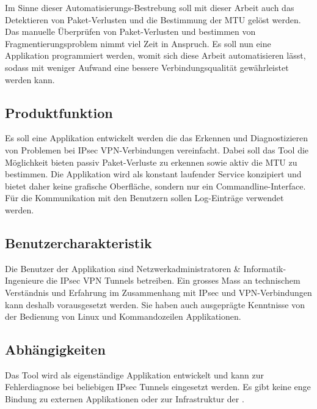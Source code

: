Im Sinne dieser Automatisierungs-Bestrebung soll mit dieser Arbeit auch das Detektieren von Paket-Verlusten und die Bestimmung der MTU gelöst werden.
Das manuelle Überprüfen von Paket-Verlusten und bestimmen von Fragmentierungsproblem nimmt viel Zeit in Anspruch. Es soll nun eine Applikation programmiert werden, womit sich diese Arbeit automatisieren lässt, sodass mit weniger Aufwand eine bessere Verbindungsqualität gewährleistet werden kann.


\subsection{Produktfunktion}
Es soll eine Applikation entwickelt werden die das Erkennen und Diagnostizieren von Problemen bei \acs{IPsec} \acs{VPN}-Verbindungen vereinfacht. Dabei soll das Tool die Möglichkeit bieten passiv Paket-Verluste zu erkennen sowie aktiv die \acs{MTU} zu bestimmen. Die Applikation wird als konstant laufender Service konzipiert und bietet daher keine grafische Oberfläche, sondern nur ein Commandline-Interface. Für die Kommunikation mit den Benutzern sollen Log-Einträge verwendet werden.

\subsection{Benutzercharakteristik}
Die Benutzer der Applikation sind Netzwerkadministratoren \& Informatik-Ingenieure die \acs{IPsec} \acs{VPN} Tunnels betreiben. Ein grosses Mass an technischem Verständnis und Erfahrung im Zusammenhang mit \acs{IPsec} und \acs{VPN}-Verbindungen kann deshalb vorausgesetzt werden. Sie haben auch ausgeprägte Kenntnisse von der Bedienung von Linux und Kommandozeilen Applikationen.

\subsection{Abhängigkeiten}
Das Tool wird als eigenständige Applikation entwickelt und kann zur Fehlerdiagnose bei beliebigen \acs{IPsec} Tunnels eingesetzt werden. Es gibt keine enge Bindung zu externen Applikationen oder zur Infrastruktur der \osag{}.